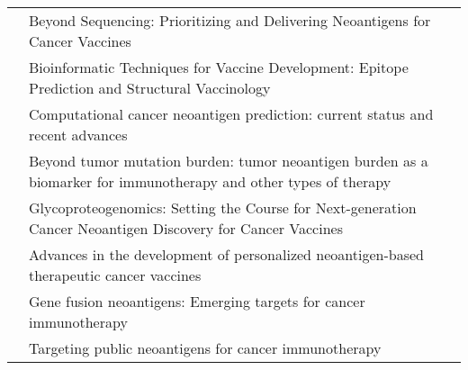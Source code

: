 \begin{table}[H]
\begin{tabular}{p{3cm}p{10cm}}
		\cite{roesler2022beyond}              & Beyond Sequencing: Prioritizing and Delivering Neoantigens for Cancer Vaccines                                                            \\
		\cite{mccaffrey2022bioinformatic}     & Bioinformatic Techniques for Vaccine Development: Epitope Prediction and Structural Vaccinology                                           \\
		\cite{fotakis2021computational}       & Computational cancer neoantigen prediction: current status and recent advances                                                            \\
		\cite{wang2021beyond}                 & Beyond tumor mutation burden: tumor neoantigen burden as a biomarker for immunotherapy and other types of therapy                         \\
		\cite{ferreira2021glycoproteogenomics}& Glycoproteogenomics: Setting the Course for Next-generation Cancer Neoantigen Discovery for Cancer Vaccines                               \\
		\cite{blass2021advances}              & Advances in the development of personalized neoantigen-based therapeutic cancer vaccines                                                  \\
		\cite{wang2021gene}                   & Gene fusion neoantigens: Emerging targets for cancer immunotherapy                                                                        \\
		\cite{pearlman2021targeting}          & Targeting public neoantigens for cancer immunotherapy                                                                                     \\	                                                                    
	\end{tabular}
\end{table}

